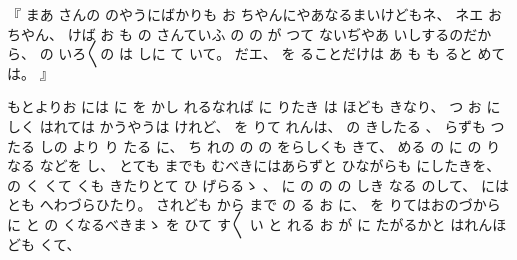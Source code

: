 
%
『
まあ
さんの
のやうにばかりも
お
ちやんにやあなるまいけどもネ、
%
ネエ
お
ちやん、
%
けば
お
も
の
さんていふ
の
の
が
つて
ないぢやあ
いしするのだから、
%
の
いろ〳〵の
は
しに
て
いて。
%
だエ、
%
を
ることだけは
あ
も
も
ると
めては。
』

%
もとよりお
には
に
を
かし
れるなれば
に
りたき
は
ほども
きなり、
%
つ
お
に
しく
はれては
かうやうは
けれど、
%
を
りて
れんは、
%
の
きしたる
、
%
らずも
つたる
しの
より
り
たる
に、
%
ち
れの
の
の
をらしくも
きて、
%
める
の
に
の
りなる
などを
し、
%
とても
までも
むべきにはあらずと
ひながらも
にしたきを、
%
の
く
くて
くも
きたりとて
ひ
げらるゝ
、
%
に
の
の
の
しき
なる
のして、
%
には
とも
へわづらひたり。
%
されども
から
まで
の
る
お
に、
%
を
りてはおのづからに
と
の
くなるべきまゝ
を
ひて
す〳〵
い
と
れる
お
が
に
たがるかと
はれんほども
くて、

